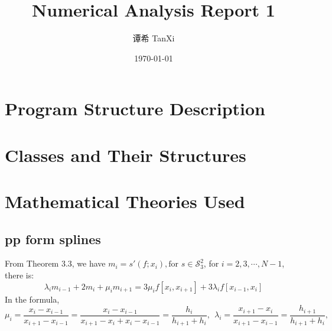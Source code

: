 \documentclass[a4paper]{article}
\title{Numerical Analysis Report 1}
\author[1]{谭希 TanXi}
\affil[1]{Zhejiang University, Email: \texttt{3220100027@zju.edu.cn}}
\date{\today}
\begin{document}
\maketitle

\section*{Program Structure Description}

\section*{Classes and Their Structures}

\section*{Mathematical Theories Used}
\subsection{pp form splines}

From Theorem 3.3, we have $m_i = s'(f;x_i), \text{for } s \in \mathcal{S}_3^2$, for $i=2,3,\cdots,N-1$, there is:
\begin{equation}
    \lambda_i m_{i-1} +2m_i +\mu_i m_{i+1} = 3\mu_i f[x_i,x_{i+1}]+3\lambda_if[x_{i-1},x_i]
\end{equation}
In the formula,
\begin{equation}
    \mu_i = \frac{x_i-x_{i-1}}{x_{i+1}-x_{i-1}}=\frac{x_i-x_{i-1}}{x_{i+1}-x_{i}+x_i-x_{i-1}} = \frac{h_i}{h_{i+1}+h_i}, \ \ \lambda_i = \frac{x_{i+1}-x_{i}}{x_{i+1}-x_{i-1}} = \frac{h_{i+1}}{h_{i+1}+h_i},
\end{equation}
\end{document}
